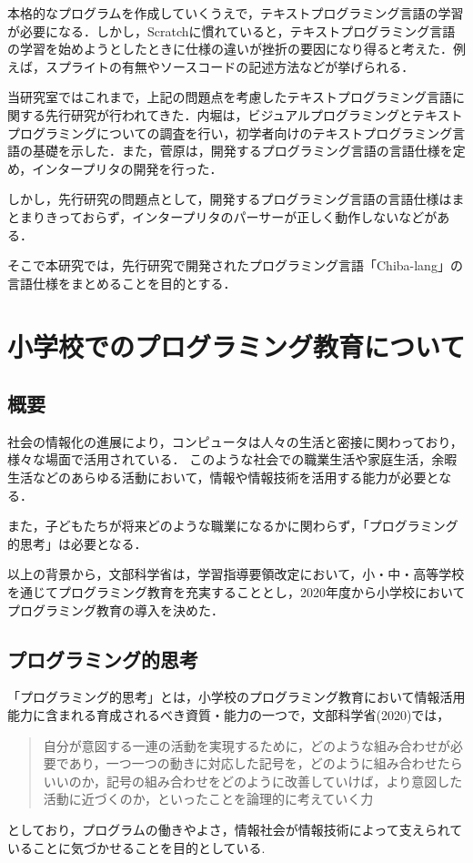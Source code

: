 \documentclass[10pt,a4j]{ltjsarticle}
\begin{document}
本格的なプログラムを作成していくうえで，テキストプログラミング言語の学習が必要になる．しかし，Scratchに慣れていると，テキストプログラミング言語の学習を始めようとしたときに仕様の違いが挫折の要因になり得ると考えた．例えば，スプライトの有無やソースコードの記述方法などが挙げられる．

当研究室ではこれまで，上記の問題点を考慮したテキストプログラミング言語に関する先行研究が行われてきた．内堀は，ビジュアルプログラミングとテキストプログラミングについての調査を行い，初学者向けのテキストプログラミング言語の基礎を示した\cite{senkou1}．また，菅原は，開発するプログラミング言語の言語仕様を定め，インタープリタの開発を行った\cite{senkou2}．

しかし，先行研究の問題点として，開発するプログラミング言語の言語仕様はまとまりきっておらず，インタープリタのパーサーが正しく動作しないなどがある．

そこで本研究では，先行研究で開発されたプログラミング言語「Chiba-lang」の言語仕様をまとめることを目的とする．
\clearpage

\section{小学校でのプログラミング教育について}
\subsection{概要}
社会の情報化の進展により，コンピュータは人々の生活と密接に関わっており，様々な場面で活用されている．
このような社会での職業生活や家庭生活，余暇生活などのあらゆる活動において，情報や情報技術を活用する能力が必要となる．

また，子どもたちが将来どのような職業になるかに関わらず，「プログラミング的思考」は必要となる．

以上の背景から，文部科学省は，学習指導要領改定において，小・中・高等学校を通じてプログラミング教育を充実することとし，2020年度から小学校においてプログラミング教育の導入を決めた\cite{pdf1}．

\subsection{プログラミング的思考}
「プログラミング的思考」とは，小学校のプログラミング教育において情報活用能力に含まれる育成されるべき資質・能力の一つで，文部科学省(2020)では，
\begin{quote}
自分が意図する一連の活動を実現するために，どのような組み合わせが必要であり，一つ一つの動きに対応した記号を，どのように組み合わせたらいいのか，記号の組み合わせをどのように改善していけば，より意図した活動に近づくのか，といったことを論理的に考えていく力
\end{quote}
としており，プログラムの働きやよさ，情報社会が情報技術によって支えられていることに気づかせることを目的としている\cite{pdf1}.
\end{document}
